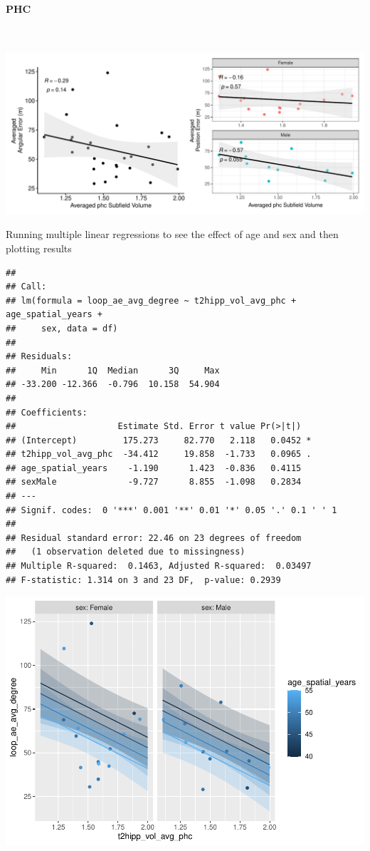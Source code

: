 \documentclass[
]{article}
\begin{document}
\newpage
\paragraph{PHC}

~ \vspace{1cm}

\includegraphics{hippocampal_subfield_files/figure-latex/unnamed-chunk-4-1.pdf}

\vspace{1cm}

Running multiple linear regressions to see the effect of age and sex and
then plotting results

\begin{verbatim}
## 
## Call:
## lm(formula = loop_ae_avg_degree ~ t2hipp_vol_avg_phc + age_spatial_years + 
##     sex, data = df)
## 
## Residuals:
##     Min      1Q  Median      3Q     Max 
## -33.200 -12.366  -0.796  10.158  54.904 
## 
## Coefficients:
##                    Estimate Std. Error t value Pr(>|t|)  
## (Intercept)         175.273     82.770   2.118   0.0452 *
## t2hipp_vol_avg_phc  -34.412     19.858  -1.733   0.0965 .
## age_spatial_years    -1.190      1.423  -0.836   0.4115  
## sexMale              -9.727      8.855  -1.098   0.2834  
## ---
## Signif. codes:  0 '***' 0.001 '**' 0.01 '*' 0.05 '.' 0.1 ' ' 1
## 
## Residual standard error: 22.46 on 23 degrees of freedom
##   (1 observation deleted due to missingness)
## Multiple R-squared:  0.1463, Adjusted R-squared:  0.03497 
## F-statistic: 1.314 on 3 and 23 DF,  p-value: 0.2939
\end{verbatim}

\includegraphics{hippocampal_subfield_files/figure-latex/Avg PHC + avg angular error MLR-1.pdf}
\end{document}

